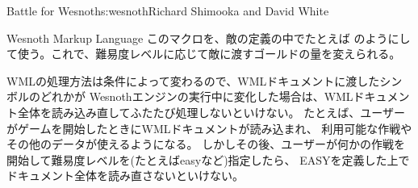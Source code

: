 \begin{aosachapter}{Battle for Wesnoth}{s:wesnoth}{Richard Shimooka and David White}
\begin{aosasect1}{Wesnoth Markup Language}
\noindent
このマクロを、敵の定義の中でたとえば
のようにして使う。これで、難易度レベルに応じて敵に渡すゴールドの量を変えられる。

WMLの処理方法は条件によって変わるので、WMLドキュメントに渡したシンボルのどれかが
Wesnothエンジンの実行中に変化した場合は、WMLドキュメント全体を読み込み直してふたたび処理しないといけない。
たとえば、ユーザーがゲームを開始したときにWMLドキュメントが読み込まれ、
利用可能な作戦やその他のデータが使えるようになる。
しかしその後、ユーザーが何かの作戦を開始して難易度レベルを(たとえばeasyなど)指定したら、
EASYを定義した上でドキュメント全体を読み直さないといけない。


\end{aosasect1}
\end{aosachapter}
